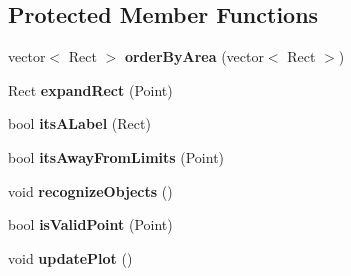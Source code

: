 \subsection*{Protected Member Functions}
\begin{DoxyCompactItemize}
\item 
vector$<$ Rect $>$ {\bfseries order\+By\+Area} (vector$<$ Rect $>$)\hypertarget{classvision_af64ac1451112ad24c36ec25db081729e}{}\label{classvision_af64ac1451112ad24c36ec25db081729e}

\item 
Rect {\bfseries expand\+Rect} (Point)\hypertarget{classvision_a547beeec2c8fdf11eb3821071102e533}{}\label{classvision_a547beeec2c8fdf11eb3821071102e533}

\item 
bool {\bfseries its\+A\+Label} (Rect)\hypertarget{classvision_ae279754cc1e9370c3110f3ede4acae40}{}\label{classvision_ae279754cc1e9370c3110f3ede4acae40}

\item 
bool {\bfseries its\+Away\+From\+Limits} (Point)\hypertarget{classvision_acbbb21511dfafeb93ed58451c843d6f1}{}\label{classvision_acbbb21511dfafeb93ed58451c843d6f1}

\item 
void {\bfseries recognize\+Objects} ()\hypertarget{classvision_aa220323a006372ceebccab4a51498319}{}\label{classvision_aa220323a006372ceebccab4a51498319}

\item 
bool {\bfseries is\+Valid\+Point} (Point)\hypertarget{classvision_a63699f62d8601812f48a8b06ad8309f1}{}\label{classvision_a63699f62d8601812f48a8b06ad8309f1}

\item 
void {\bfseries update\+Plot} ()\hypertarget{classvision_a71ea3478a09dc629bcf7b4d84a27c4b7}{}\label{classvision_a71ea3478a09dc629bcf7b4d84a27c4b7}

\end{DoxyCompactItemize}
